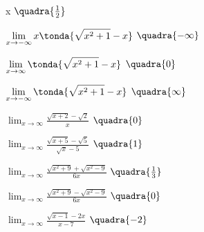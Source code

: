 \begin{esercizio}
\begin{multicols}{2}
\begin{enumeratea}
          x\)
  \hfill \(\quadra{\frac{1}{2}}\)
  \item \(\displaystyle \lim_{x \rightarrow -\infty} 
          x\tonda{\sqrt{x^2+1}-x}\)
  \hfill \(\quadra{-\infty}\)
  \item \(\displaystyle \lim_{x \rightarrow \infty} 
          \tonda{\sqrt{x^2+1}-x}\)
  \hfill \(\quadra{0}\)
  \item \(\displaystyle \lim_{x \rightarrow -\infty} 
          \tonda{\sqrt{x^2+1}-x}\)
  \hfill \(\quadra{\infty}\)
  \item \(\displaystyle \lim_{x \rightarrow \infty} 
          \frac{\sqrt{x+2}-\sqrt{2}}{x}\)
  \hfill \(\quadra{0}\)
  \item \(\displaystyle \lim_{x \rightarrow \infty} 
          \frac{\sqrt{x+5}-\sqrt{5}}{\sqrt{x}-5}\)
  \hfill \(\quadra{1}\)
  \item \(\displaystyle \lim_{x \rightarrow \infty} 
          \frac{\sqrt{x^2+9}+\sqrt{x^2-9}}{6x}\)
  \hfill \(\quadra{\frac{1}{3}}\)
  \item \(\displaystyle \lim_{x \rightarrow \infty} 
          \frac{\sqrt{x^2+9}-\sqrt{x^2-9}}{6x}\)
  \hfill \(\quadra{0}\)
  \item \(\displaystyle \lim_{x \rightarrow \infty} 
          \frac{\sqrt{x-1}-2x}{x-7}\)
  \hfill \(\quadra{-2}\)
 \end{enumeratea}
 \end{multicols}
\end{esercizio}


